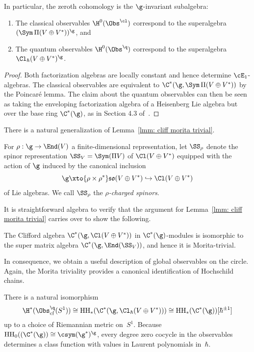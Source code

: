 \documentclass[10pt]{amsart}
\begin{document}
In particular, the zeroth cohomology is the $\g$-invariant subalgebra:
\begin{enumerate}
\item The classical observables $\H^0(\Obs^{\cl})$ correspond to the superalgebra $(\Sym\, \Pi (V \oplus V^*))^\g$, and 
\item The quantum observables $\H^0(\Obs^{\q})$ correspond to the superalgebra $\Cl_\hbar(V \oplus V^*)^\g$.
\end{enumerate}

\begin{proof}
Both factorization algebras are locally constant and hence determine $\cE_1$-algebras.
The classical observables are equivalent to $\C^*(\g,\Sym\, \Pi (V \oplus V^*))$ by the Poincar\'e lemma.
The claim about the quantum observables can then be seen as taking the enveloping factorization algebra of a Heisenberg Lie algebra but over the base ring $\C^*(\g)$,
as in Section 4.3 of~\cite{CG1}.
\end{proof}

There is a natural generalization of Lemma~\ref{lmm: cliff morita trivial}.

\begin{dfn}
For $\rho: \g \to \End(V)$ a finite-dimensional representation, 
let $\SS_\rho$ denote the spinor representation $\SS_V = \Sym(\Pi V)$ of $\Cl(V \oplus V^*)$ equipped with the action of $\g$ induced by the canonical inclusion
\[
\g \xto{\rho \times \rho^*} \mathfrak{so}(V \oplus V^*) \hookrightarrow \Cl(V \oplus V^*)
\]
of Lie algebras.
We call $\SS_\rho$ the {\em $\rho$-charged spinors}.
\end{dfn}

It is straightforward algebra to verify that the argument for Lemma~\ref{lmm: cliff morita trivial} carries over to show the following.

\begin{lmm}
The Clifford algebra $\C^*(\g,\Cl(V \oplus V^*))$ in $\C^*(\g)$-modules is isomorphic to the super matrix algebra $\C^*(\g,\End(\SS_V))$, and hence it is Morita-trivial.
\end{lmm}

In consequence, we obtain a useful description of global observables on the circle. 
Again, the Morita triviality provides a canonical identification of Hochschild chains.

\begin{lmm}
\label{lmm: iso to hoch}
There is a natural isomorphism
\[
\H^*(\Obs^\q_{\rm cf}(S^1)) \cong {\rm HH}_*(\C^*(\g, \Cl_\hbar(V \oplus V^*))) \cong {\rm HH}_*(\C^*(\g))[\hbar^{\pm 1}]
\]
up to a choice of Riemannian metric on~$S^1$.
Because ${\rm HH}_0((\C^*(\g)) \cong \csym(\g^*)^\g$, every degree zero cocycle in the observables determines a class function with values in Laurent polynomials in~$\hbar$.
\end{lmm}
\end{document}
